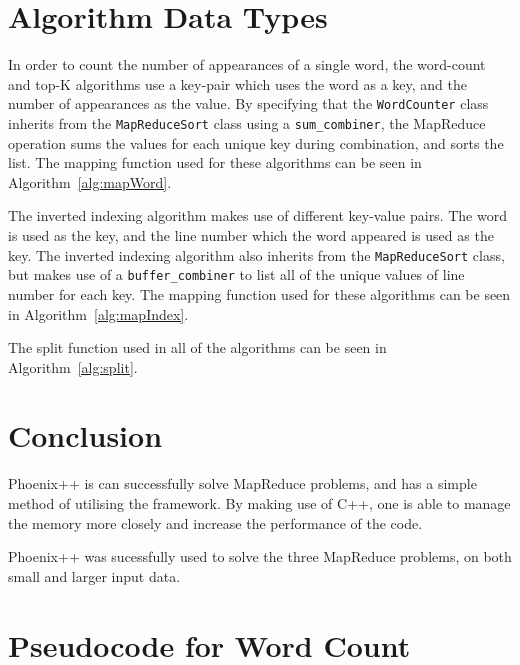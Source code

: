 \documentclass[12pt,onecolumn]{IEEEtran}
\begin{document}
	\section{Algorithm Data Types}
	
	In order to count the number of appearances of a single word, the word-count and top-K algorithms use a key-pair which uses the word as a key, and the number of appearances as the value. By specifying that the \verb|WordCounter| class inherits from the \verb|MapReduceSort| class using a \verb|sum_combiner|, the MapReduce operation sums the values for each unique key during combination, and sorts the list. The mapping function used for these algorithms can be seen in Algorithm~\ref{alg:mapWord}.
	
	The inverted indexing algorithm makes use of different key-value pairs. The word is used as the key, and the line number which the word appeared is used as the key. The inverted indexing algorithm also inherits from the \verb|MapReduceSort| class, but makes use of a \verb|buffer_combiner| to list all of the unique values of line number for each key. The mapping function used for these algorithms can be seen in Algorithm~\ref{alg:mapIndex}.
	
	The split function used in all of the algorithms can be seen in Algorithm~\ref{alg:split}.
	
	\section{Conclusion}
	
	Phoenix++ is can successfully solve MapReduce problems, and has a simple method of utilising the framework. By making use of C++, one is able to manage the memory more closely and increase the performance of the code.
	
	Phoenix++ was sucessfully used to solve the three MapReduce problems, on both small and larger input data.
	
	\clearpage
	\appendices
	\renewcommand\thefigure{\thesection.\arabic{figure}} 
	\renewcommand\theequation{\thesection.\arabic{equation}} 
	\renewcommand\thetable{\thesection.\arabic{table}}
	\renewcommand\thelstlisting{\thesection.\arabic{lstlisting}}
	
	\section{Pseudocode for Word Count}
	\setcounter{figure}{0}  
	\setcounter{equation}{0} 
	\setcounter{table}{0}
\end{document}

